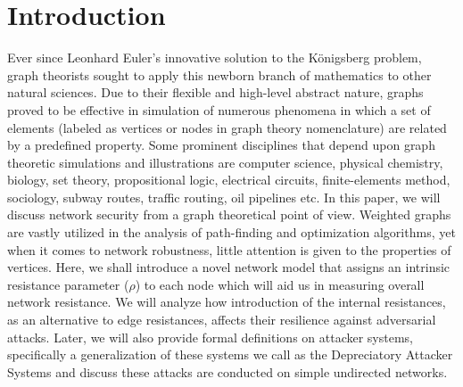 \documentclass{article}
\begin{document}
	\section{Introduction}
	Ever since Leonhard Euler's innovative solution to the K\"{o}nigsberg problem, graph theorists sought to apply this newborn branch of mathematics to other natural sciences. Due to their flexible and high-level abstract nature, graphs proved to be effective in simulation of numerous phenomena in which a set of elements (labeled as vertices or nodes in graph theory nomenclature) are related by a predefined property\cite{tucker2012applied}. Some prominent disciplines that depend upon graph theoretic simulations and illustrations are computer science, physical chemistry\cite{klein1993m}, biology\cite{mason2007graph}, set theory, propositional logic, electrical circuits, finite-elements method, sociology, subway routes, traffic routing, oil pipelines etc. In this paper, we will discuss network security from a graph theoretical point of view. Weighted graphs are vastly utilized in the analysis of path-finding and optimization algorithms, yet when it comes to network robustness, little attention is given to the properties of vertices. Here, we shall introduce a novel network model that assigns an intrinsic resistance parameter ($\rho$) to each node which will aid us in measuring overall network resistance. We will analyze how introduction of the internal resistances, as an alternative to edge resistances, affects their resilience against adversarial attacks. Later, we will also provide formal definitions on attacker systems, specifically a generalization of these systems we call as the Depreciatory Attacker Systems and discuss these attacks are conducted on simple undirected networks.
	
	
\end{document}
